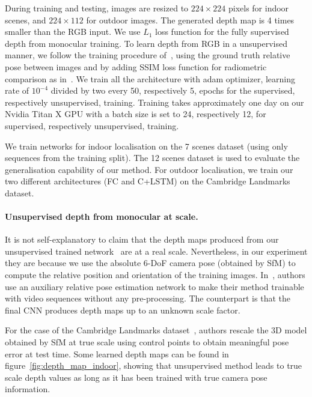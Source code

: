 During training and testing, images are resized to $224 \times 224$ pixels for indoor scenes, and $224 \times 112$ for outdoor images. The generated depth map is 4 times smaller than the RGB input. We use $L_1$ loss function for the fully supervised depth from monocular training. To learn depth from RGB in a unsupervised manner, we follow the training procedure of~\citep{Zhou2017a}, using the ground truth relative pose between images and by adding SSIM loss function for radiometric comparison as in~\citep{Mahjourian2018}. We train all the architecture with adam optimizer, learning rate of $10^{-4}$ divided by two every 50, respectively 5, epochs for the supervised, respectively unsupervised, training. Training takes approximately one day on our Nvidia Titan X GPU with a batch size is set to 24, respectively 12, for supervised, respectively unsupervised, training.

We train networks for indoor localisation on the 7 scenes dataset (using only sequences from the training split). The 12 scenes dataset is used to evaluate the generalisation capability of our method. For outdoor localisation, we train our two different architectures (FC and C+LSTM) on the Cambridge Landmarks dataset.

\paragraph{Unsupervised depth from monocular at scale.} It is not self-explanatory to claim that the depth maps produced from our unsupervised trained network~\citep{Zhou2017a} are at a real scale. Nevertheless, in our experiment they are because we use the absolute 6-DoF camera pose (obtained by SfM) to compute the relative position and orientation of the training images. In~\citep{Zhou2017a}, authors use an auxiliary relative pose estimation network to make their method trainable with video sequences without any pre-processing. The counterpart is that the final CNN produces depth maps up to an unknown scale factor.

For the case of the Cambridge Landmarks dataset~\citep{Kendall2015}, authors rescale the 3D model obtained by SfM at true scale using control points to obtain meaningful pose error at test time. Some learned depth maps can be found in figure~\ref{fig:depth_map_indoor}, showing that unsupervised method leads to true scale depth values as long as it has been trained with true camera pose information.


